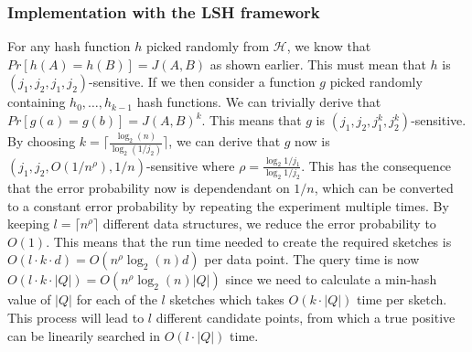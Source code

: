 \subsubsection{Implementation with the LSH framework}
For any hash function $h$ picked randomly from $\mathcal{H}$, we know that $Pr[h(A)=h(B)]=J(A,B)$ as shown earlier. This must mean that $h$ is $(j_1, j_2, j_1, j_2)$-sensitive. If we then consider a function $g$ picked randomly containing $h_0, \dots, h_{k-1}$ hash functions. We can trivially derive that $Pr[g(a)=g(b)]=J(A,B)^k$. This means that $g$ is $(j_1, j_2, j_1^k, j_2^k)$-sensitive. By choosing $k=\lceil \frac{\log_2(n)}{\log_2(1/j_2)} \rceil$, we can derive that $g$ now is $(j_1, j_2, O(1/n^\rho), 1/n)$-sensitive where $\rho=\frac{\log_2{1/j_1}}{\log_2{1/j_2}}$. %
This has the consequence that the error probability now is dependendant on $1/n$, which can be converted to a constant error probability by repeating the experiment multiple times. By keeping $l=\lceil n^\rho \rceil$ different data structures, we reduce the error probability to $O(1)$.
This means that the run time needed to create the required sketches is $O(l\cdot k \cdot d)=O(n^\rho \log_2(n)d)$ per data point. The query time is now $O(l\cdot k \cdot |Q|)=O(n^\rho \log_2(n)|Q|)$ since we need to calculate a min-hash value of $|Q|$ for each of the $l$ sketches which takes $O(k\cdot |Q|)$ time per sketch. This process will lead to $l$ different candidate points, from which a true positive can be linearily searched in $O(l\cdot |Q|)$ time.
